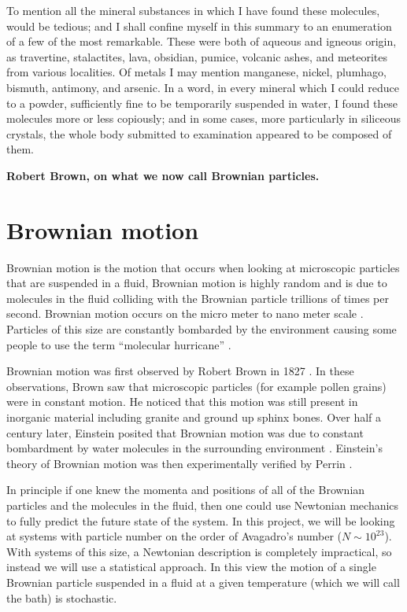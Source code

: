 \epigraph{
To mention all the mineral substances in which I have found these molecules, would be tedious; and I shall confine myself in this summary to an enumeration of a few of the most remarkable. These were both of aqueous and igneous origin, as travertine, stalactites, lava, obsidian, pumice, volcanic ashes, and meteorites from various localities. Of metals I may mention manganese, nickel, plumhago, bismuth, antimony, and arsenic. In a word, in every mineral which I could reduce to a powder, sufficiently fine to be temporarily suspended in water, I found these molecules more or less copiously; and in some cases, more particularly in siliceous crystals, the whole body submitted to examination appeared to be composed of them.}{\textbf{Robert Brown, on what we now call Brownian particles.}}

\section{Brownian motion}
Brownian motion is the motion that occurs when looking at microscopic particles that are suspended in a fluid, Brownian motion is highly random and is due to molecules in the fluid colliding with the Brownian particle trillions of times per second. Brownian motion occurs on the micro meter to nano meter scale \cite{KellerBustamante2000,Reimann2001}. Particles of this size are constantly bombarded by the environment causing some people to use the term ``molecular hurricane'' \cite{Astumian2007}.

Brownian motion was first observed by Robert Brown in 1827 \cite{Brown1828}. In these observations, Brown saw that microscopic particles (for example pollen grains) were in constant motion. He noticed that this motion was still present in inorganic material including granite and ground up sphinx bones.
Over half a century later, Einstein posited that Brownian motion was due to constant bombardment by water molecules in the surrounding environment \cite{Einstein1905}. Einstein's theory of Brownian motion was then experimentally verified by Perrin \cite{Perrin2013}.

In principle if one knew the momenta and positions of all of the Brownian particles and the molecules in the fluid, then one could use Newtonian mechanics to fully predict the future state of the system. In this project, we will be looking at systems with particle number on the order of Avagadro's number ($N \sim 10^{23}$). With systems of this size, a Newtonian description is completely impractical, so instead we will use a statistical approach. In this view the motion of a single Brownian particle suspended in a fluid at a given temperature (which we will call the bath) is stochastic.

